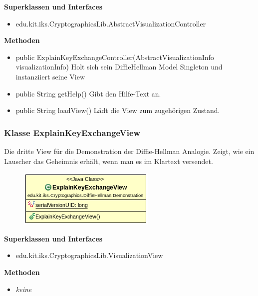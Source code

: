 \documentclass{article}
\begin{document}
      \textbf{Superklassen und Interfaces}
      \begin{itemize}
        \item edu.kit.iks.CryptographicsLib.AbstractVisualizationController
      \end{itemize}

      \textbf{Methoden}
      \begin{itemize}
          \item public ExplainKeyExchangeController(AbstractVisualizationInfo visualizationInfo) \newline
              Holt sich sein DiffieHellman Model Singleton und instanziiert seine View
        \item public String getHelp() \newline
        Gibt den Hilfe-Text an.
        \item public String loadView() \newline
        Lädt die View zum zugehörigen Zustand.
      \end{itemize}

\subsubsection{Klasse ExplainKeyExchangeView}
      Die dritte View für die Demonstration der Diffie-Hellman Analogie.
      Zeigt, wie ein Lauscher das Geheimnis erhält, wenn man es
      im Klartext versendet.

      \begin{figure}[H]
        \centering
        \includegraphics{resources/edu-kit-iks-Cryptographics-DiffieHellman-Demonstration-ExplainKeyExchangeView}
      \end{figure}

      \textbf{Superklassen und Interfaces}
      \begin{itemize}
        \item edu.kit.iks.CryptographicsLib.VisualizationView
      \end{itemize}

      \textbf{Methoden}
      \begin{itemize}
        \item \textit{keine}
      \end{itemize}
\end{document}
